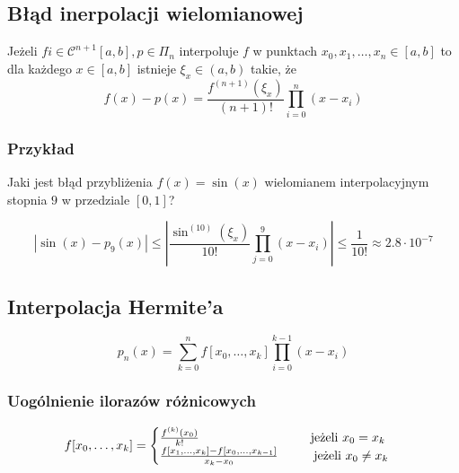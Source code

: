 \documentclass[../mn-notatki.tex]{subfiles}
\begin{document}
\subsection{Błąd inerpolacji wielomianowej}
\begin{tcolorbox}
Jeżeli $f i\in \mathcal{C}^{n+1}[a,b], p \in \Pi_n$ interpoluje $f$ w punktach
$x_0, x_1, \ldots, x_n \in [a,b]$ to dla każdego $x \in [a,b]$ istnieje
$\xi_x \in (a,b)$ takie, że
\[
f(x) - p(x) = \frac{f^{(n+1)}(\xi_x)}{(n+1)!} \prod_{i=0}^{n} (x-x_i)
\]
\end{tcolorbox}

\subsubsection{Przykład}

Jaki jest błąd przybliżenia $f(x) = \sin(x)$ wielomianem interpolacyjnym
stopnia $9$ w przedziale $[0,1]$?

\[
|\sin(x) - p_9(x)| \leqslant
\left| \frac{\sin^{(10)}(\xi_x)}{10!} \prod_{j=0}^{9} (x-x_i) \right|
\leqslant \frac{1}{10!} \approx 2.8 \cdot 10^{-7}
\]

\subsection{Interpolacja Hermite'a}

\begin{tcolorbox}
\[
p_n(x) = \sum_{k=0}^{n} f[x_0,\ldots,x_k] \prod_{i=0}^{k-1} (x-x_i)
\]
\end{tcolorbox}

\subsubsection{Uogólnienie ilorazów różnicowych}

\begin{tcolorbox}
\[
f[x_0,\ldots,x_k] = \begin{cases}
\frac{f^{(k)}(x_0)}{k!} \tab\tab\tab \text{~jeżeli } x_0 = x_k\\
\frac{f[x_1,\ldots,x_k] - f[x_0,\ldots,x_{k-1}]}{x_k - x_0}
\tab \text{jeżeli } x_0 \neq x_k
\end{cases}
\]
\end{tcolorbox}

\pagebreak
\end{document}
